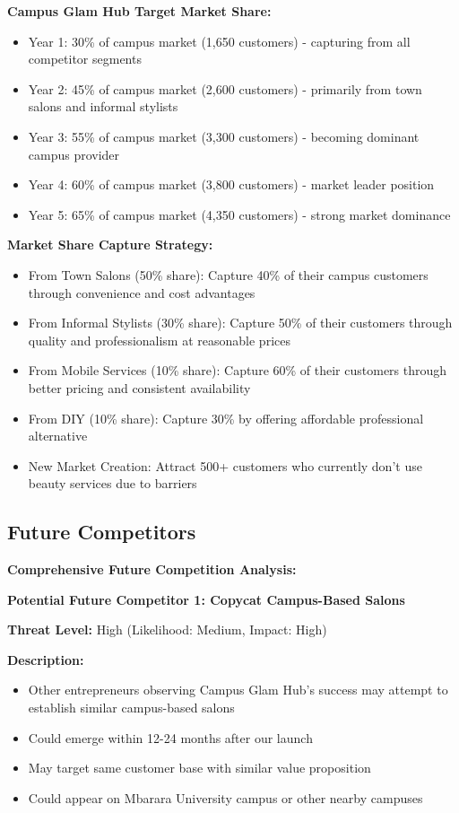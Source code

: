 \vspace{1em}

\textbf{Campus Glam Hub Target Market Share:}
\begin{itemize}[leftmargin=2em]
    \item Year 1: 30\% of campus market (1,650 customers) - capturing from all competitor segments
    \item Year 2: 45\% of campus market (2,600 customers) - primarily from town salons and informal stylists
    \item Year 3: 55\% of campus market (3,300 customers) - becoming dominant campus provider
    \item Year 4: 60\% of campus market (3,800 customers) - market leader position
    \item Year 5: 65\% of campus market (4,350 customers) - strong market dominance
\end{itemize}

\textbf{Market Share Capture Strategy:}
\begin{itemize}[leftmargin=2em]
    \item From Town Salons (50\% share): Capture 40\% of their campus customers through convenience and cost advantages
    \item From Informal Stylists (30\% share): Capture 50\% of their customers through quality and professionalism at reasonable prices
    \item From Mobile Services (10\% share): Capture 60\% of their customers through better pricing and consistent availability
    \item From DIY (10\% share): Capture 30\% by offering affordable professional alternative
    \item New Market Creation: Attract 500+ customers who currently don't use beauty services due to barriers
\end{itemize}

\subsection{Future Competitors}

\textbf{Comprehensive Future Competition Analysis:}

\textbf{Potential Future Competitor 1: Copycat Campus-Based Salons}

\textbf{Threat Level:} High (Likelihood: Medium, Impact: High)

\textbf{Description:}
\begin{itemize}[leftmargin=2em]
    \item Other entrepreneurs observing Campus Glam Hub's success may attempt to establish similar campus-based salons
    \item Could emerge within 12-24 months after our launch
    \item May target same customer base with similar value proposition
    \item Could appear on Mbarara University campus or other nearby campuses
\end{itemize}

